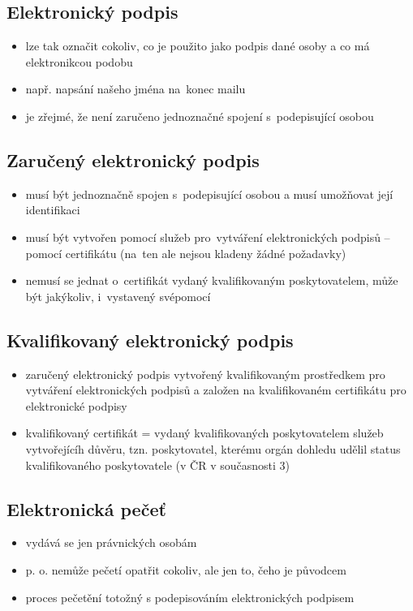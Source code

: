 \subsection{Elektronický podpis}
\begin{itemize}
    \item lze tak označit cokoliv, co je použito jako podpis dané osoby a co má elektronikcou podobu
    \item např. napsání našeho jména na~konec mailu
    \item je zřejmé, že není zaručeno jednoznačné spojení s~podepisující osobou
\end{itemize}

\subsection{Zaručený elektronický podpis}
\begin{itemize}
    \item musí být jednoznačně spojen s~podepisující osobou a musí umožňovat její identifikaci
    \item musí být vytvořen pomocí služeb pro~vytváření elektronických podpisů -- pomocí certifikátu (na~ten ale nejsou kladeny žádné požadavky)
    \item nemusí se jednat o~certifikát vydaný kvalifikovaným poskytovatelem, může být jakýkoliv, i~vystavený svépomocí
\end{itemize}

\subsection{Kvalifikovaný elektronický podpis}
\begin{itemize}
    \item zaručený elektronický podpis vytvořený kvalifikovaným prostředkem pro vytváření elektronických podpisů a založen na kvalifikovaném certifikátu pro elektronické podpisy
    \item kvalifikovaný certifikát = vydaný kvalifikovaných poskytovatelem služeb vytvořejícíh důvěru, tzn. poskytovatel, kterému orgán dohledu udělil status kvalifikovaného poskytovatele (v ČR v současnosti 3)
\end{itemize}

\subsection{Elektronická pečeť}
\begin{itemize}
    \item vydává se jen právnických osobám
    \item p. o. nemůže pečetí opatřit cokoliv, ale jen to, čeho je původcem
    \item proces pečetění totožný s podepisováním elektronických podpisem
\end{itemize}

